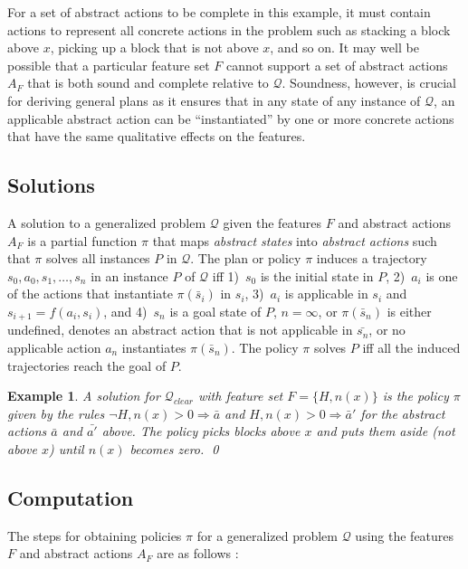 \documentclass[letterpaper]{article} %
\newtheorem{example}[definition]{Example}
\newcommand{\Q}{\mathcal{Q}}
\newcommand{\Rule}[2]{\ensuremath{#1 \Rightarrow #2}}
\begin{document}
For a set of abstract actions to be complete in this example, it must
contain actions to represent all concrete actions in the problem
such as stacking a block above $x$, picking up a block that is
not above $x$, and so on.
It may well be possible that a particular feature set $F$ cannot support
a set of abstract actions $A_F$ that is both sound and complete relative
to $\Q$. Soundness, however, is crucial for deriving general plans as it
ensures that in any state of any instance of $\Q$, an applicable abstract
action  can be ``instantiated'' by one or more concrete actions that have
the same qualitative effects on the features. 


\subsection{Solutions}

A solution to a generalized problem $\Q$ given the features $F$ and abstract
actions $A_F$ is a partial function $\pi$ that maps \emph{abstract states}
into \emph{abstract actions} such that $\pi$ solves all instances $P$ in $\Q$.
The plan or policy $\pi$ induces a trajectory $s_0,a_0,s_1, \ldots, s_n$ in
an instance $P$ of $\Q$ iff
1)~$s_0$ is the initial state in $P$,
2)~$a_i$ is one of the actions that instantiate $\pi(\bar{s}_i)$ in $s_i$,
3)~$a_i$ is applicable in $s_i$ and $s_{i+1}=f(a_i,s_i)$, and
4)~$s_n$ is a goal state of $P$, $n=\infty$, or $\pi(\bar{s}_n)$ is either
undefined, denotes an abstract action that is not applicable in $\bar{s_n}$,
or no applicable action $a_n$ instantiates $\pi(\bar{s}_n)$.
The policy $\pi$ solves $P$ iff all the induced trajectories reach the
goal of $P$.

\begin{example}
  A solution for $\Q_{clear}$ with feature set
  $F=\{H,n(x)\}$ is the policy $\pi$ given by the rules
  $\Rule{\neg H, n(x)>0}{\bar{a}}$ and $\Rule{H, n(x)>0}{\bar{a}'}$
  for the abstract actions $\bar{a}$ and $\bar{a'}$ above.
  The policy picks blocks above $x$ and puts them aside (not above $x$)
  until $n(x)$ becomes zero. \qed
\end{example}


\subsection{Computation}

The steps for obtaining policies $\pi$ for a generalized problem $\Q$
using the features $F$ and abstract actions $A_F$ are as follows \cite{bonet:ijcai2018}:
\end{document}
